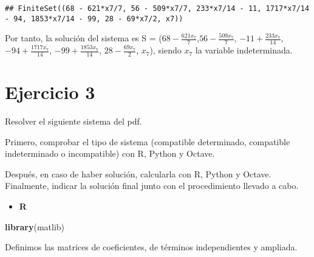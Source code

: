 \documentclass[
]{article}
\newenvironment{Shaded}{\begin{snugshade}}{\end{snugshade}}
\newcommand{\KeywordTok}[1]{\textcolor[rgb]{0.13,0.29,0.53}{\textbf{#1}}}
\newcommand{\NormalTok}[1]{#1}
\providecommand{\tightlist}{%
  \setlength{\itemsep}{0pt}\setlength{\parskip}{0pt}}
\begin{document}
\begin{verbatim}
## FiniteSet((68 - 621*x7/7, 56 - 509*x7/7, 233*x7/14 - 11, 1717*x7/14 - 94, 1853*x7/14 - 99, 28 - 69*x7/2, x7))
\end{verbatim}

Por tanto, la solución del sistema es S =
(\(68 - \frac{621x_7}{7}\),\(56 - \frac{509x_7}{7}\),
\(-11 + \frac{233x_7}{14}\), \(-94 + \frac{1717x_7}{14}\),
\(-99 + \frac{1853x_7}{14}\), \(28 - \frac{69x_7}{2}\), \(x_7\)), siendo
\(x_7\) la variable indeterminada.

\hypertarget{ejercicio-3}{%
\section{Ejercicio 3}\label{ejercicio-3}}

Resolver el siguiente sistema del pdf.

Primero, comprobar el tipo de sistema (compatible determinado,
compatible indeterminado o incompatible) con R, Python y Octave.

Después, en caso de haber solución, calcularla con R, Python y Octave.
Finalmente, indicar la solución final junto con el procedimiento llevado
a cabo.

\begin{itemize}
\tightlist
\item
  \textbf{R}
\end{itemize}

\begin{Shaded}
\begin{Highlighting}[]
\KeywordTok{library}\NormalTok{(matlib)}
\end{Highlighting}
\end{Shaded}

Definimos las matrices de coeficientes, de términos independientes y
ampliada.
\end{document}
